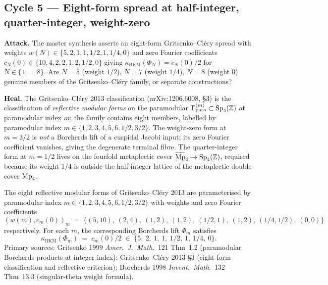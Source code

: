 \subsection*{Cycle 5 --- Eight-form spread at half-integer, quarter-integer, weight-zero}

\textbf{Attack.} The master synthesis asserts an eight-form
Gritsenko--Cl\'ery spread with weights
$w(N) \in \{5, 2, 1, 1, 1/2, 1, 1/4, 0\}$ and zero Fourier coefficients
$c_N(0) \in \{10, 4, 2, 2, 1, 2, 1/2, 0\}$ giving
$\kappa_{\mathrm{BKM}}(\Phi_N) = c_N(0)/2$ for $N \in \{1, \ldots, 8\}$.
Are $N = 5$ (weight $1/2$), $N = 7$ (weight $1/4$), $N = 8$ (weight
$0$) genuine members of the Gritsenko--Cl\'ery family, or separate
constructions?

\textbf{Heal.} The Gritsenko--Cl\'ery 2013 classification (arXiv:1206.6008,
\S3) is the classification of \emph{reflective modular forms} on the
paramodular $\Gamma_{\mathrm{para}}^{(m)} \subset \mathrm{Sp}_4(\mathbb{Z})$ at
paramodular index $m$; the family contains eight members, labelled by
paramodular index $m \in \{1, 2, 3, 4, 5, 6, 1/2, 3/2\}$. The
weight-zero form at $m = 3/2$ is \emph{not} a Borcherds lift of a
cuspidal Jacobi input; its zero Fourier coefficient vanishes, giving
the degenerate terminal fibre. The quarter-integer form at $m = 1/2$
lives on the fourfold metaplectic cover $\widetilde{\mathrm{Mp}}_4 \to \mathrm{Sp}_4(\mathbb{Z})$,
required because its weight $1/4$ is outside the half-integer lattice
of the metaplectic double cover $\mathrm{Mp}_4$.

\begin{theorem}
\ClaimStatusTheorem
\label{thm:eight-form-spread}
The eight reflective modular forms of Gritsenko--Cl\'ery 2013 are
parameterised by paramodular index $m \in \{1, 2, 3, 4, 5, 6, 1/2, 3/2\}$
with weights and zero Fourier coefficients
\[
  (w(m), c_m(0))_{m} \;=\; \{
  (5, 10),\ (2, 4),\ (1, 2),\ (1, 2),\ (1/2, 1),\ (1, 2),\ (1/4, 1/2),\ (0, 0)
  \}
\]
respectively. For each $m$, the corresponding Borcherds lift
$\Phi_m$ satisfies
\[
  \kappa_{\mathrm{BKM}}(\Phi_m) \;=\; c_m(0)/2
  \;\in\; \{5,\ 2,\ 1,\ 1,\ 1/2,\ 1,\ 1/4,\ 0\}.
\]
Primary sources: Gritsenko 1999 \emph{Amer.\ J.\ Math.}\ 121 Thm~1.2
(paramodular Borcherds products at integer index); Gritsenko--Cl\'ery
2013 \S3 (eight-form classification and reflective criterion);
Borcherds 1998 \emph{Invent.\ Math.}\ 132 Thm~13.3 (singular-theta
weight formula).
\end{theorem}

